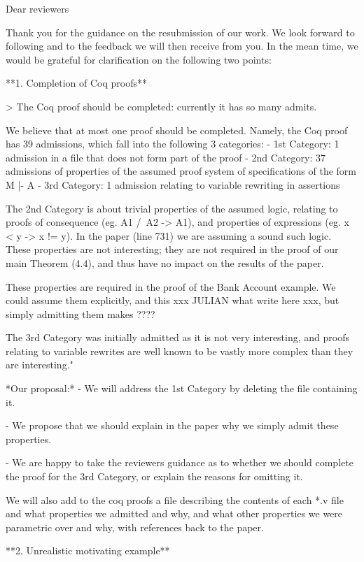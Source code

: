 
Dear reviewers 

Thank you for the guidance on the resubmission of our work. We look forward to following
and to the feedback we will then receive from you. In the mean time, we would be grateful
for clarification on the following two points:

**1. Completion of Coq proofs**

> The Coq proof should be completed: currently it has so many admits.

We believe that at most one proof should be completed. Namely, the Coq proof has 
39  admissions, which fall into the following 3 categories:
 - 1st Category: 1 admission in a file that does not form part of the proof 
- 2nd Category: 37 admissions of properties of the assumed proof system 
    of specifications of the form M |- A
- 3rd Category: 1 admission relating to variable rewriting in assertions

 
The 2nd Category is about trivial properties of the  assumed logic, relating to 
proofs of consequence  (eg. A1 /\ A2 -> A1), and properties of expressions 
(eg. x < y -> x != y). In the paper (line 731) we are assuming a sound such logic.
These properties are not interesting; they are not required in the proof of our main
Theorem (4.4), and thus have no impact on the results of the paper.

 These properties are required in the proof of the Bank Account example.  We
 could assume them explicitly, and this xxx JULIAN what write here xxx, but 
 simply admitting them makes ???? 

The 3rd Category was initially admitted as it is not very interesting, and proofs 
relating to variable rewrites are well known to be vastly more complex than they 
are interesting."

*Our proposal:*
- We will address the 1st Category  by deleting the file containing it.

- We propose that we should explain in the  paper why we simply admit these
properties.

- We are happy to take the reviewers guidance as to whether we should complete
the proof for the 3rd Category, or explain the reasons for omitting it.

We will also add to the coq proofs a file describing the contents of each *.v file 
and what properties we admitted and why, and what other properties we were
parametric over and why, with references back to the paper.

**2. Unrealistic motivating example**

